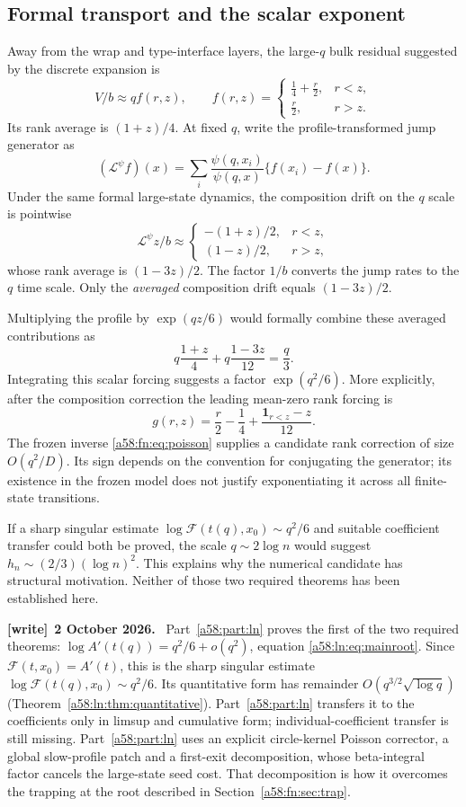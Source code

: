 \documentclass[11pt,letterpaper]{article}
\theoremstyle{remark}
\newcommand{\FF}{\mathcal F}
\newcommand{\one}{\mathbf 1}
\newenvironment{writenote}[1][]{\par\smallskip\begingroup\small
 \noindent\textbf{[write]}\if\relax\detokenize{#1}\relax\else~\textbf{#1.}\fi\ }%
 {\par\endgroup\smallskip}
\begin{document}
\subsection{Formal transport and the scalar exponent}
Away from the wrap and type-interface layers, the large-$q$ bulk residual suggested by the discrete expansion is
\[
 V/b\approx q f(r,z),\qquad
 f(r,z)=\begin{cases}\tfrac14+\tfrac r2,&r<z,\\
 \tfrac r2,&r>z.
 \end{cases}
\]
Its rank average is $(1+z)/4$. At fixed $q$, write the profile-transformed jump generator as
\[
 (\mathcal L^\psi f)(x)=\sum_i\frac{\psi(q,x_i)}{\psi(q,x)}\{f(x_i)-f(x)\}.
\]
Under the same formal large-state dynamics, the composition drift on the $q$ scale is pointwise
\[
 \mathcal L^\psi z/b\approx
 \begin{cases}-(1+z)/2,&r<z,\\(1-z)/2,&r>z,
 \end{cases}
\]
whose rank average is $(1-3z)/2$. The factor $1/b$ converts the jump rates to the $q$ time scale. Only the \emph{averaged} composition drift equals $(1-3z)/2$.

Multiplying the profile by $\exp(qz/6)$ would formally combine these averaged contributions as
\[
 q\frac{1+z}{4}+q\frac{1-3z}{12}=\frac q3.
\]
Integrating this scalar forcing suggests a factor $\exp(q^2/6)$. More explicitly, after the composition correction the leading mean-zero rank forcing is
\[
 g(r,z)=\frac r2-\frac14+\frac{\one_{r<z}-z}{12}.
\]
The frozen inverse \eqref{a58:fn:eq:poisson} supplies a candidate rank correction of size $O(q^2/D)$. Its sign depends on the convention for conjugating the generator; its existence in the frozen model does not justify exponentiating it across all finite-state transitions.

If a sharp singular estimate $\log\FF(t(q),x_0)\sim q^2/6$ and suitable coefficient transfer could both be proved, the scale $q\sim2\log n$ would suggest $h_n\sim(2/3)(\log n)^2$. This explains why the numerical candidate has structural motivation. Neither of those two required theorems has been established here.
\begin{writenote}[2 October 2026]
Part~\ref{a58:part:ln} proves the first of the two required theorems: $\log A'(t(q))=q^2/6+o(q^2)$, equation \eqref{a58:ln:eq:mainroot}. Since $\FF(t,x_0)=A'(t)$, this is the sharp singular estimate $\log\FF(t(q),x_0)\sim q^2/6$. Its quantitative form has remainder $O(q^{3/2}\sqrt{\log q})$ (Theorem~\ref{a58:ln:thm:quantitative}). Part~\ref{a58:part:ln} transfers it to the coefficients only in limsup and cumulative form; individual-coefficient transfer is still missing. Part~\ref{a58:part:ln} uses an explicit circle-kernel Poisson corrector, a global slow-profile patch and a first-exit decomposition, whose beta-integral factor cancels the large-state seed cost. That decomposition is how it overcomes the trapping at the root described in Section~\ref{a58:fn:sec:trap}.
\end{writenote}
\end{document}

